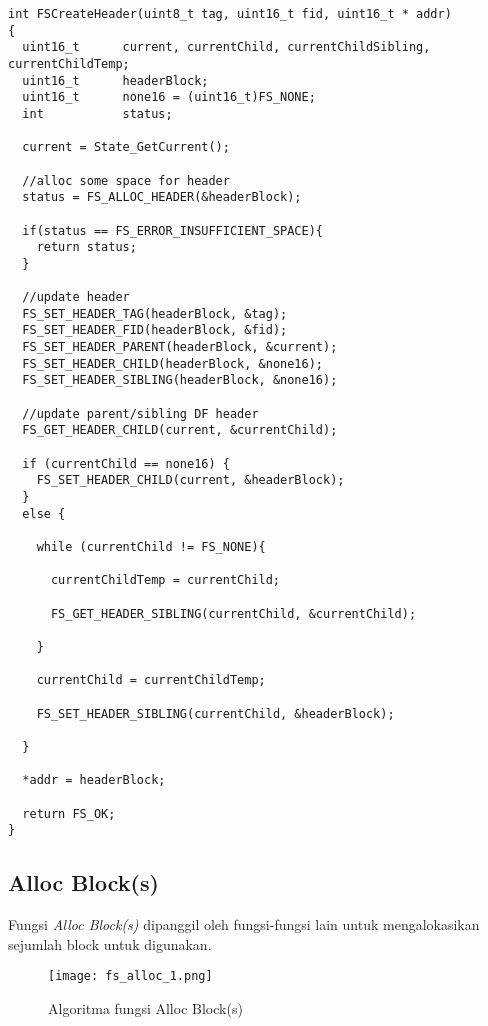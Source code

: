 \begin{lstlisting}[caption={Listing Program Fungsi FS Create Header}, label={list-createheader}]
int FSCreateHeader(uint8_t tag, uint16_t fid, uint16_t * addr)
{
  uint16_t      current, currentChild, currentChildSibling, currentChildTemp;
  uint16_t      headerBlock;
  uint16_t      none16 = (uint16_t)FS_NONE;
  int           status;

  current = State_GetCurrent();

  //alloc some space for header
  status = FS_ALLOC_HEADER(&headerBlock);

  if(status == FS_ERROR_INSUFFICIENT_SPACE){
    return status;
  }

  //update header
  FS_SET_HEADER_TAG(headerBlock, &tag);
  FS_SET_HEADER_FID(headerBlock, &fid);
  FS_SET_HEADER_PARENT(headerBlock, &current);
  FS_SET_HEADER_CHILD(headerBlock, &none16);
  FS_SET_HEADER_SIBLING(headerBlock, &none16);

  //update parent/sibling DF header
  FS_GET_HEADER_CHILD(current, &currentChild);

  if (currentChild == none16) {
    FS_SET_HEADER_CHILD(current, &headerBlock);
  }
  else {

    while (currentChild != FS_NONE){

      currentChildTemp = currentChild;

      FS_GET_HEADER_SIBLING(currentChild, &currentChild);

    }

    currentChild = currentChildTemp;

    FS_SET_HEADER_SIBLING(currentChild, &headerBlock);

  }

  *addr = headerBlock;

  return FS_OK;
}
\end{lstlisting}

\subsection{Alloc Block(s)}

Fungsi {\em Alloc Block(s)} dipanggil oleh fungsi-fungsi lain untuk mengalokasikan sejumlah block untuk digunakan. 

\begin{figure}
\centering
\texttt{[image: fs\_alloc\_1.png]}
\caption{Algoritma fungsi Alloc Block(s)}
\label{fig-alloc-1}
\end{figure}

